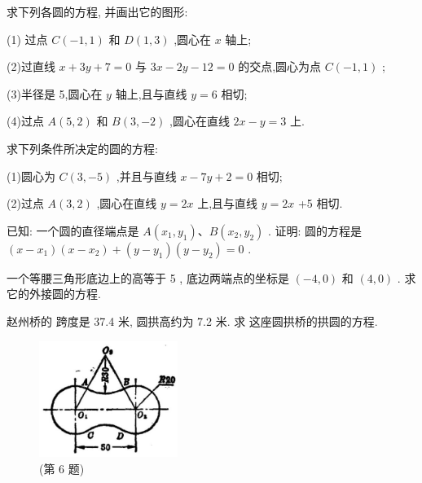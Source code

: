 \documentclass[lang=cn,newtx,10.5pt,scheme=chinese]{elegantbook}
\begin{document}
\begin{problemset}[习 题 五]

\item 求下列各圆的方程, 并画出它的图形:

(1) 过点 \(C\left( {-1,1}\right)\) 和 \(D\left( {1,3}\right)\) ,圆心在 \(x\) 轴上;

(2)过直线 \(x + {3y} + 7 = 0\) 与 \({3x} - {2y} - {12} = 0\) 的交点,圆心为点 \(C\left( {-1,1}\right)\) ;

(3)半径是 5,圆心在 \(y\) 轴上,且与直线 \(y = 6\) 相切;

(4)过点 \(A\left( {5,2}\right)\) 和 \(B\left( {3, - 2}\right)\) ,圆心在直线 \({2x} - y = 3\) 上.

\item 求下列条件所决定的圆的方程:

(1)圆心为 \(C\left( {3, - 5}\right)\) ,并且与直线 \(x - {7y} + 2 = 0\) 相切;

(2)过点 \(A\left( {3,2}\right)\) ,圆心在直线 \(y = {2x}\) 上,且与直线 \(y = {2x}\) +5 相切.

\item 已知: 一个圆的直径端点是 \(A\left( {{x}_{1},{y}_{1}}\right) \text{、}B\left( {{x}_{2},{y}_{2}}\right)\) . 证明: 圆的方程是 \(\left( {x - {x}_{1}}\right) \left( {x - {x}_{2}}\right) + \left( {y - {y}_{1}}\right) \left( {y - {y}_{2}}\right) = 0\) .

\item 一个等腰三角形底边上的高等于 5 , 底边两端点的坐标是 \(\left( {-4,0}\right)\) 和 \(\left( {4,0}\right)\) . 求它的外接圆的方程.

\item 赵州桥的 跨度是 37.4 米, 圆拱高约为 7.2 米. 求 这座圆拱桥的拱圆的方程.

\begin{figure}[h]
  \centering
  \includegraphics[max width=0.4\textwidth]{images/01912cc2-ffb6-728e-9ae7-b113ff05c64b_85_663180.jpg}
  \caption{(第 6 题)}
\end{figure}




\end{problemset}
\end{document}
